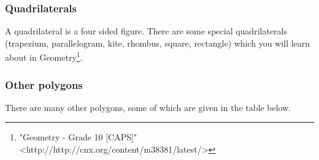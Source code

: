             \subsubsection{ Quadrilaterals}
            \nopagebreak
            \label{m39368*eip-366}
A quadrilateral is a four sided figure. There are some special quadrilaterals (trapezium, parallelogram, kite, rhombus, square, rectangle) which you will learn about in Geometry\footnote{\raggedright{}"Geometry - Grade 10 [CAPS]" <http://http://cnx.org/content/m38381/latest/>}. 
\par \label{m39368*uid91}
            \subsubsection{ Other polygons}
            \nopagebreak
            
        
        \label{m39368*id319439}There are many other polygons, some of which are given in the table below.\par 
        
    
      
    
    \setlength\mytablespace{4\tabcolsep}
    \addtolength\mytablespace{3\arrayrulewidth}
    \setlength\mytablewidth{\linewidth}
        
    
    \setlength\mytableroom{\mytablewidth}
    \addtolength\mytableroom{-\mytablespace}
    
    \setlength\myfixedwidth{0pt}
    \setlength\mystarwidth{\mytableroom}
        \addtolength\mystarwidth{-\myfixedwidth}
        \divide{}
        
